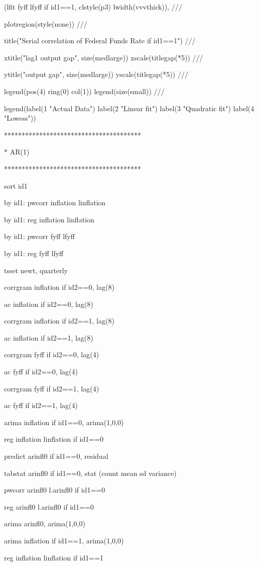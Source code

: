 \documentclass[12pt,a4paper]{article}%
\begin{document}
(lfit fyff lfyff if id1==1, clstyle(p3) lwidth(vvvthick)), ///

plotregion(style(none)) ///

title("Serial correlation of Federal Funds Rate if id1==1") ///

xtitle("lag1 output gap", size(medlarge)) xscale(titlegap(*5)) ///

ytitle("output gap", size(medlarge)) yscale(titlegap(*5)) ///

legend(pos(4) ring(0) col(1)) legend(size(small)) ///

legend(label(1 "Actual Data") label(2 "Linear fit") label(3 "Quadratic fit")
label(4 "Lowess"))

***************************************

* AR(1)

***************************************

sort id1

by id1: pwcorr inflation linflation

by id1: reg inflation linflation

by id1: pwcorr fyff lfyff

by id1: reg fyff lfyff

tsset newt, quarterly

corrgram inflation if id2==0, lag(8)

ac inflation if id2==0, lag(8)

corrgram inflation if id2==1, lag(8)

ac inflation if id2==1, lag(8)

corrgram fyff if id2==0, lag(4)

ac fyff if id2==0, lag(4)

corrgram fyff if id2==1, lag(4)

ac fyff if id2==1, lag(4)

arima inflation if id1==0, arima(1,0,0)

reg inflation linflation if id1==0

predict arinfl0 if id1==0, residual

tabstat arinfl0 if id1==0, stat (count mean sd variance)

pwcorr arinfl0 l.arinfl0 if id1==0

reg arinfl0 l.arinfl0 if id1==0

arima arinfl0, arima(1,0,0)

arima inflation if id1==1, arima(1,0,0)

reg inflation linflation if id1==1
\end{document}

